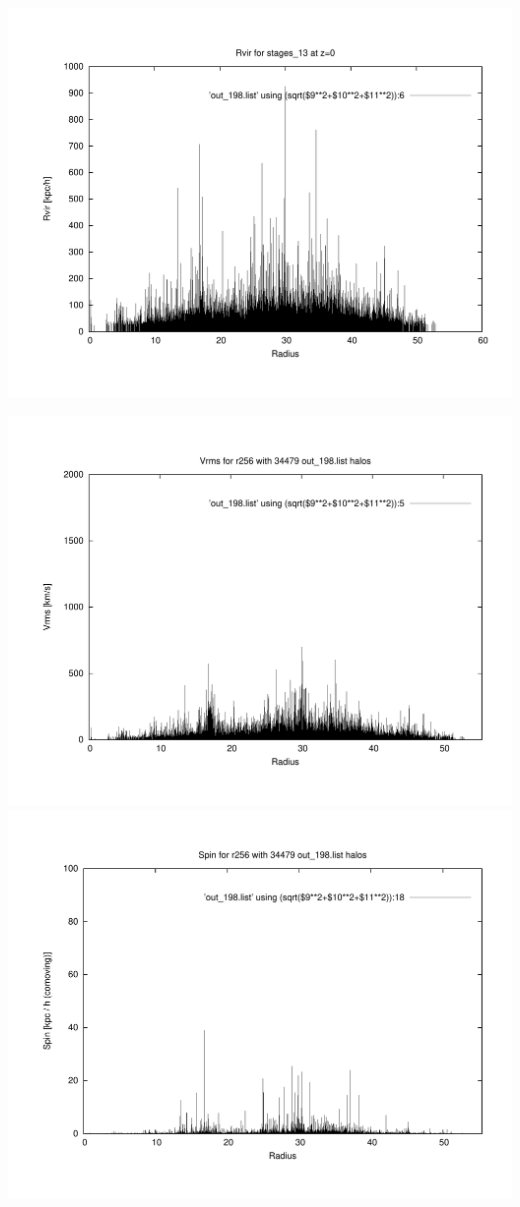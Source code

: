 \includegraphics[scale=0.3]{r256/h100/stages_13/plot_rvir_z0.pdf}

\includegraphics[scale=0.3]{r256/h100/stages_13/plot_Vrms_out_198.pdf}
\includegraphics[scale=0.3]{r256/h100/stages_13/plot_spin_out_198.pdf}

